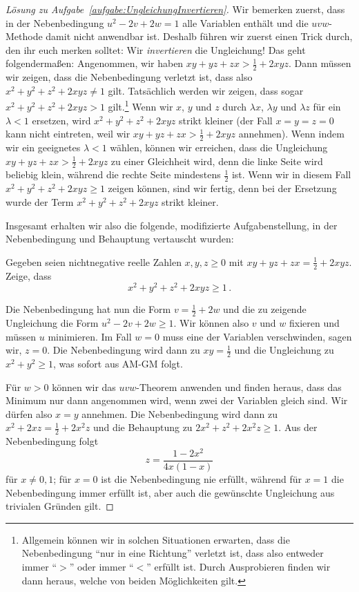 \begin{proof}[Lösung zu Aufgabe~\ref{aufgabe:UngleichungInvertieren}]
	Wir bemerken zuerst, dass in der Nebenbedingung $u^2-2v+2w=1$ alle Variablen enthält und die $uvw$-Methode damit nicht anwendbar ist. Deshalb führen wir zuerst einen Trick durch, den ihr euch merken solltet: Wir \emph{invertieren} die Ungleichung! Das geht folgendermaßen: Angenommen, wir haben $xy+yz+zx>\frac12+2xyz$. Dann müssen wir zeigen, dass die Nebenbedingung verletzt ist, dass also $x^2+y^2+z^2+2xyz\neq 1$ gilt. Tatsächlich werden wir zeigen, dass sogar $x^2+y^2+z^2+2xyz>1$ gilt.\footnote{Allgemein können wir in solchen Situationen erwarten, dass die Nebenbedingung \enquote{nur in eine Richtung} verletzt ist, dass also entweder immer \enquote{$>$} oder immer \enquote{$<$} erfüllt ist. Durch Ausprobieren finden wir dann heraus, welche von beiden Möglichkeiten gilt.} Wenn wir $x$, $y$ und $z$ durch $\lambda x$, $\lambda y$ und $\lambda z$ für ein $\lambda <1$ ersetzen, wird $x^2+y^2+z^2+2xyz$ strikt kleiner (der Fall $x=y=z=0$ kann nicht eintreten, weil wir $xy+yz+zx>\frac12+2xyz$ annehmen). Wenn indem wir ein geeignetes $\lambda<1$ wählen, können wir erreichen, dass die Ungleichung $xy+yz+zx>\frac12+2xyz$ zu einer Gleichheit wird, denn die linke Seite wird beliebig klein, während die rechte Seite mindestens $\frac12$ ist. Wenn wir in diesem Fall $x^2+y^2+z^2+2xyz\geqslant 1$ zeigen können, sind wir fertig, denn bei der Ersetzung wurde der Term $x^2+y^2+z^2+2xyz$ strikt kleiner.
	
	Insgesamt erhalten wir also die folgende, modifizierte Aufgabenstellung, in der Nebenbedingung und Behauptung vertauscht wurden:\addtocounter{caufgabe}{-1}
	\begin{aufgabe*}[$'$]
		Gegeben seien nichtnegative reelle Zahlen $x,y,z\geqslant 0$ mit $xy+yz+zx=\frac12+2xyz$. Zeige, dass
		\begin{equation*}
			x^2+y^2+z^2+2xyz\geqslant 1\,.
		\end{equation*}
	\end{aufgabe*}
	Die Nebenbedingung hat nun die Form $v=\frac12+2w$ und die zu zeigende Ungleichung die Form $u^2-2v+2w\geqslant 1$. Wir können also $v$ und $w$ fixieren und müssen $u$ minimieren. Im Fall $w=0$ muss eine der Variablen verschwinden, sagen wir, $z=0$. Die Nebenbedingung wird dann zu $xy=\frac12$ und die Ungleichung zu $x^2+y^2\geqslant 1$, was sofort aus AM-GM folgt.
	
	Für $w>0$ können wir das $uvw$-Theorem anwenden und finden heraus, dass das Minimum nur dann angenommen wird, wenn zwei der Variablen gleich sind. Wir dürfen also $x=y$ annehmen. Die Nebenbedingung wird dann zu $x^2+2xz=\frac12+2x^2z$ und die Behauptung zu $2x^2+z^2+2x^2z\geqslant 1$. Aus der Nebenbedingung folgt
	\begin{equation*}
		z=\frac{1-2x^2}{4x(1-x)}
	\end{equation*}
	für $x\neq 0,1$; für $x=0$ ist die Nebenbedingung nie erfüllt, während für $x=1$ die Nebenbedingung immer erfüllt ist, aber auch die gewünschte Ungleichung aus trivialen Gründen gilt.
	

\end{proof}
